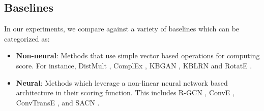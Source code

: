 \documentclass[11pt,a4paper]{article}
\begin{document}
\subsection{Baselines}
\label{sec:baselines}
In our experiments, we compare \method{} against a variety of baselines which can be categorized as:
\begin{itemize}[itemsep=3pt,parsep=0pt,partopsep=0pt,leftmargin=10pt,topsep=2pt]

\item \textbf{Non-neural}: Methods that use simple vector based operations for computing score. For instance, DistMult \cite{distmult}, ComplEx \cite{complex}, KBGAN \cite{kbgan}, KBLRN \cite{kblrn} and RotatE \cite{rotate}.

\item \textbf{Neural}: Methods which leverage a non-linear neural network based architecture in their scoring function. This includes R-GCN \cite{r_gcn}, ConvE \cite{conve}, ConvTransE \cite{sacn_paper}, and SACN \cite{sacn_paper}.

\end{itemize}

\iffalse
	In our experiments, we compare \method{} against the following methods:
	\begin{itemize}[itemsep=3pt,parsep=0pt,partopsep=0pt,leftmargin=10pt,topsep=2pt]
\item	\textbf{DistMult} \cite{distmult} uses a bilinear model for capturing compositional semantics of relations. 
\item	\textbf{ComplEx} \cite{complex} extends DistMult by introducing complex embeddings for modeling asymmetric relations.
		\item	\textbf{R-GCN} \cite{r_gcn} employs a generalization of Graph Convolutional Networks for encoding knowledge graph entities.
		\item	\textbf{ConvE} \cite{conve} uses a 2D Convolutional Neural Network based model for embedding a knowledge graph.
		\item	\textbf{ConvTransE} \cite{sacn_paper} is a modification of ConvE which allows entities and relations to have the translation property.
		\item	\textbf{SACN} \cite{sacn_paper} utilizes ConvTransE with weighted graph convolutional network as the entity encoder. 
		\item	\textbf{RotatE} \cite{rotate} defines each relation as a rotation from the source entity to the target entity in the complex vector space.
		\item	\textbf{\method{}} is the method proposed in this paper. Please refer to Section \ref{sec:details} for more details.
	\end{itemize}
\fi
\end{document}
